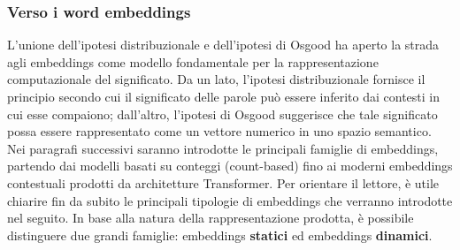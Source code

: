 \subsubsection{Verso i word embeddings}
\label{subsubsec:towards_embeddings}
L'unione dell'ipotesi distribuzionale e dell'ipotesi di Osgood ha aperto la strada agli embeddings come modello fondamentale per la rappresentazione computazionale del significato. Da un lato, l'ipotesi distribuzionale fornisce il principio secondo cui il significato delle parole può essere inferito dai contesti in cui esse compaiono; dall'altro, l'ipotesi di Osgood suggerisce che tale significato possa essere rappresentato come un vettore numerico in uno spazio semantico.
Nei paragrafi successivi saranno introdotte le principali famiglie di embeddings, partendo dai modelli basati su conteggi (count-based) fino ai moderni embeddings contestuali prodotti da architetture Transformer. Per orientare il lettore, è utile chiarire fin da subito le principali tipologie di embeddings che verranno introdotte nel seguito.
In base alla natura della rappresentazione prodotta, è possibile distinguere due grandi famiglie: embeddings \textbf{statici} ed embeddings \textbf{dinamici}.
